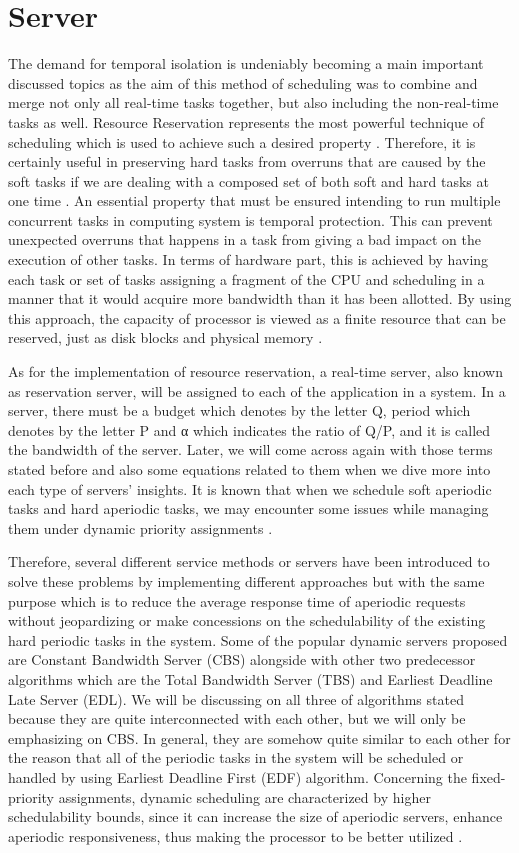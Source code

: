 \section{Server}

The demand for temporal isolation is undeniably becoming a main important discussed topics as the aim of this method of scheduling was to combine and merge not only all real-time tasks together, but also including the non-real-time tasks as well. Resource Reservation represents the most powerful technique of scheduling which is used to achieve such a desired property \cite{b1}. Therefore, it is certainly useful in preserving hard tasks from overruns that are caused by the soft tasks if we are dealing with a composed set of both soft and hard tasks at one time \cite{b4}. An essential property that must be ensured intending to run multiple concurrent tasks in computing system is temporal protection. This can prevent unexpected overruns that happens in a task from giving a bad impact on the execution of other tasks. In terms of hardware part, this is achieved by having each task or set of tasks assigning a fragment of the CPU and scheduling in a manner that it would acquire more bandwidth than it has been allotted. By using this approach, the capacity of processor is viewed as a finite resource that can be reserved, just as disk blocks and physical memory \cite{b2}.

As for the implementation of resource reservation, a real-time server, also known as reservation server, will be assigned to each of the application in a system. In a server, there must be a budget which denotes by the letter Q, period which denotes by the letter P and α which indicates the ratio of Q/P, and it is called the bandwidth of the server. Later, we will come across again with those terms stated before and also some equations related to them when we dive more into each type of servers’ insights. It is known that when we schedule soft aperiodic tasks and hard aperiodic tasks, we may encounter some issues while managing them under dynamic priority assignments \cite{b4}.

Therefore, several different service methods or servers have been introduced to solve these problems by implementing different approaches but with the same purpose which is to reduce the average response time of aperiodic requests without jeopardizing or make concessions on the schedulability of the existing hard periodic tasks in the system. Some of the popular dynamic servers proposed are Constant Bandwidth Server (CBS) alongside with other two predecessor algorithms which are the Total Bandwidth Server (TBS) and Earliest Deadline Late Server (EDL). We will be discussing on all three of algorithms stated because they are quite interconnected with each other, but we will only be emphasizing on CBS. In general, they are somehow quite similar to each other for the reason that all of the periodic tasks in the system will be scheduled or handled by using Earliest Deadline First (EDF) algorithm. Concerning the fixed-priority assignments, dynamic scheduling are characterized by higher schedulability bounds, since it can increase the size of aperiodic servers, enhance aperiodic responsiveness, thus making the processor to be better utilized \cite{b6}. 


